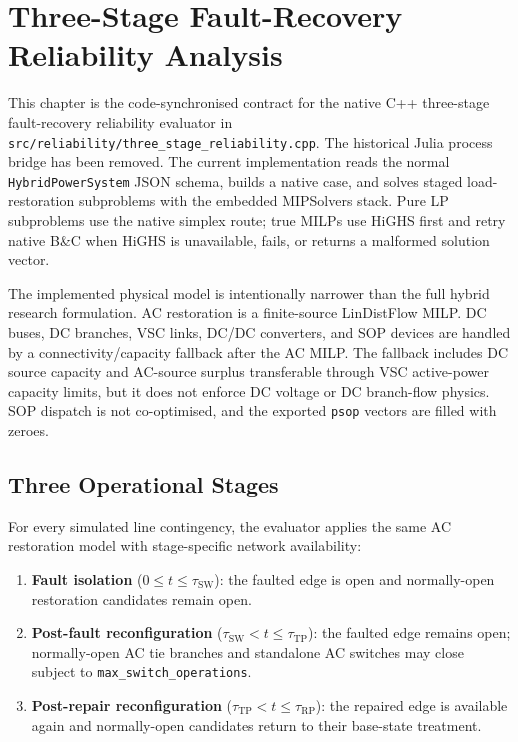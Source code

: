 \section{Three-Stage Fault-Recovery Reliability Analysis}
\label{sec:three_stage_reliability}

This chapter is the code-synchronised contract for the native C++ three-stage
fault-recovery reliability evaluator in
\texttt{src/reliability/three\_stage\_reliability.cpp}.  The historical Julia
process bridge has been removed.  The current implementation reads the normal
\texttt{HybridPowerSystem} JSON schema, builds a native case, and solves staged
load-restoration subproblems with the embedded MIPSolvers stack.  Pure LP
subproblems use the native simplex route; true MILPs use HiGHS first and retry
native B\&C when HiGHS is unavailable, fails, or returns a malformed solution
vector.

The implemented physical model is intentionally narrower than the full hybrid
research formulation.  AC restoration is a finite-source LinDistFlow MILP.  DC
buses, DC branches, VSC links, DC/DC converters, and SOP devices are handled by
a connectivity/capacity fallback after the AC MILP.  The fallback includes DC
source capacity and AC-source surplus transferable through VSC active-power
capacity limits, but it does not enforce DC voltage or DC branch-flow physics.
SOP dispatch is not co-optimised, and the exported \texttt{psop} vectors are
filled with zeroes.

\subsection{Three Operational Stages}
\label{sec:3stage-background}

For every simulated line contingency, the evaluator applies the same AC
restoration model with stage-specific network availability:

\begin{enumerate}[label=\textbf{Stage \arabic*:}]
  \item \textbf{Fault isolation} ($0 \le t \le \tau_{\mathrm{SW}}$): the
        faulted edge is open and normally-open restoration candidates remain
        open.
  \item \textbf{Post-fault reconfiguration}
        ($\tau_{\mathrm{SW}} < t \le \tau_{\mathrm{TP}}$): the faulted edge
        remains open; normally-open AC tie branches and standalone AC switches
        may close subject to \texttt{max\_switch\_operations}.
  \item \textbf{Post-repair reconfiguration}
        ($\tau_{\mathrm{TP}} < t \le \tau_{\mathrm{RP}}$): the repaired edge is
        available again and normally-open candidates return to their base-state
        treatment.
\end{enumerate}

